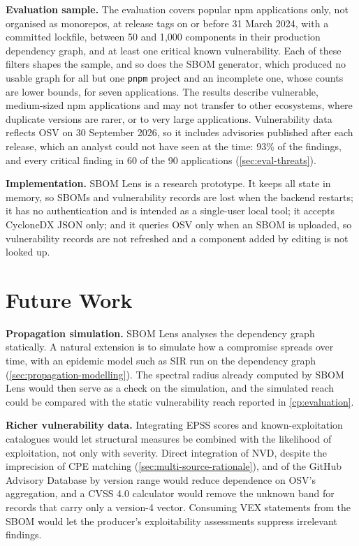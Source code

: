 \textbf{Evaluation sample.} The evaluation covers popular npm applications only, not organised as monorepos, at release tags on or before 31 March 2024, with a committed lockfile, between 50 and 1{,}000 components in their production dependency graph, and at least one critical known vulnerability. Each of these filters shapes the sample, and so does the SBOM generator, which produced no usable graph for all but one \texttt{pnpm} project and an incomplete one, whose counts are lower bounds, for seven applications. The results describe vulnerable, medium-sized npm applications and may not transfer to other ecosystems, where duplicate versions are rarer, or to very large applications. Vulnerability data reflects OSV on 30 September 2026, so it includes advisories published after each release, which an analyst could not have seen at the time: 93\% of the findings, and every critical finding in 60 of the 90 applications (\autoref{sec:eval-threats}).

\textbf{Implementation.} SBOM Lens is a research prototype. It keeps all state in memory, so SBOMs and vulnerability records are lost when the backend restarts; it has no authentication and is intended as a single-user local tool; it accepts CycloneDX JSON only; and it queries OSV only when an SBOM is uploaded, so vulnerability records are not refreshed and a component added by editing is not looked up.


\section{Future Work}
\label{sec:concl-future}

\textbf{Propagation simulation.} SBOM Lens analyses the dependency graph statically. A natural extension is to simulate how a compromise spreads over time, with an epidemic model such as SIR run on the dependency graph (\autoref{sec:propagation-modelling}). The spectral radius already computed by SBOM Lens would then serve as a check on the simulation, and the simulated reach could be compared with the static vulnerability reach reported in \autoref{cp:evaluation}.

\textbf{Richer vulnerability data.} Integrating EPSS scores and known-exploitation catalogues would let structural measures be combined with the likelihood of exploitation, not only with severity. Direct integration of NVD, despite the imprecision of CPE matching (\autoref{sec:multi-source-rationale}), and of the GitHub Advisory Database by version range would reduce dependence on OSV's aggregation, and a CVSS 4.0 calculator would remove the unknown band for records that carry only a version-4 vector. Consuming VEX statements from the SBOM would let the producer's exploitability assessments suppress irrelevant findings.

